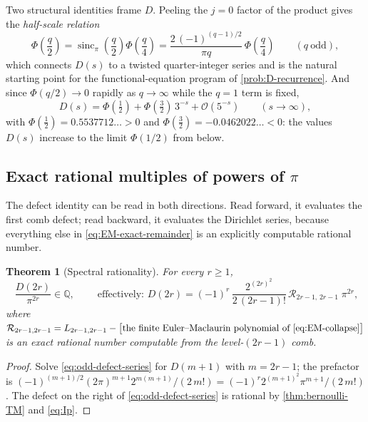 \documentclass[11pt,oneside]{article}
\numberwithin{equation}{section}
\newtheorem{theorem}{Theorem}[section]
\theoremstyle{definition}
\theoremstyle{remark}
\newcommand{\Q}{\mathbb Q}
\newcommand{\sincpi}{\operatorname{sinc}_{\pi}}
\newcommand{\bigO}{\mathcal O}
\newcommand{\defect}{\mathcal R}
\begin{document}
Two structural identities frame $D$.  Peeling the $j=0$ factor of the
product gives the \emph{half-scale relation}
\begin{equation}
 \Phi\!\left(\frac q2\right)
 =\sincpi\!\left(\frac q2\right)\Phi\!\left(\frac q4\right)
 =\frac{2\,(-1)^{(q-1)/2}}{\pi q}\,
 \Phi\!\left(\frac q4\right)
 \qquad(q\ \text{odd}),
 \label{eq:half-scale}
\end{equation}
which connects $D(s)$ to a twisted quarter-integer series and is the
natural starting point for the functional-equation program of
\cref{prob:D-recurrence}.  And since $\Phi(q/2)\to0$ rapidly as
$q\to\infty$ while the $q=1$ term is fixed,
\begin{equation}
 D(s)=\Phi(\tfrac12)+\Phi(\tfrac32)\,3^{-s}+\bigO(5^{-s})
 \qquad(s\to\infty),
 \label{eq:D-first-harmonic}
\end{equation}
with $\Phi(\tfrac12)=0.5537712\ldots>0$ and
$\Phi(\tfrac32)=-0.0462022\ldots<0$: the values $D(s)$ increase to the
limit $\Phi(1/2)$ from below.

\subsection{Exact rational multiples of powers of \texorpdfstring{$\pi$}{pi}}

The defect identity can be read in both directions.  Read forward, it
evaluates the first comb defect; read backward, it evaluates the
Dirichlet series, because everything else in
\eqref{eq:EM-exact-remainder} is an explicitly computable rational
number.

\begin{theorem}[Spectral rationality]
\label{thm:D-rational}
For every $r\ge1$,
\begin{equation}
 \boxed{\;\frac{D(2r)}{\pi^{2r}}\in\Q,\;}
 \qquad\text{effectively: }
 D(2r)
 =(-1)^{r}\,
 \frac{2^{(2r)^2}}{2\,(2r-1)!}\,
 \defect_{2r-1,\,2r-1}\;\pi^{2r},
 \label{eq:D-rational}
\end{equation}
where $\defect_{2r-1,2r-1}=L_{2r-1,2r-1}-\bigl[\text{the finite
Euler--Maclaurin polynomial of \eqref{eq:EM-collapse}}\bigr]$ is an
exact rational number computable from the level-$(2r-1)$ comb.
\end{theorem}

\begin{proof}
Solve \eqref{eq:odd-defect-series} for $D(m+1)$ with $m=2r-1$; the
prefactor is
$(-1)^{(m+1)/2}(2\pi)^{m+1}2^{m(m+1)}/(2\,m!)
=(-1)^{r}2^{(m+1)^2}\pi^{m+1}/(2\,m!)$.  The defect on the right of
\eqref{eq:odd-defect-series} is rational by
\cref{thm:bernoulli-TM} and \eqref{eq:Ip}.
\end{proof}
\end{document}
